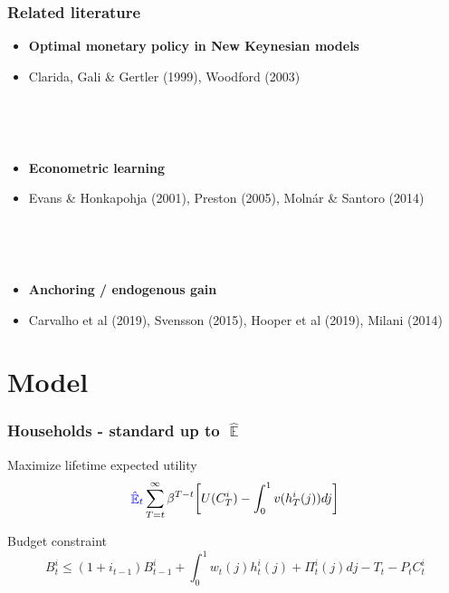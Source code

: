 \documentclass{beamer}
\DeclareMathOperator{\E}{\mathbb{E}}
\begin{document}
\begin{frame}
	\frametitle{Related literature}

\begin{itemize}
\item \textbf{Optimal monetary policy in New Keynesian models}
\item[] Clarida, Gali \& Gertler (1999), Woodford (2003)

\

\

\item \textbf{Econometric learning}
\item[] Evans \& Honkapohja (2001), Preston (2005), Moln\'ar \& Santoro (2014)

\

\

\item \textbf{Anchoring / endogenous gain} 
\item[] Carvalho et al (2019), Svensson (2015), Hooper et al (2019), Milani (2014)
\end{itemize}



\end{frame}

\section{Model}

\begin{frame}
	\frametitle{Households - standard up to $\hat{\E}$}
	\label{HH}

Maximize lifetime expected utility
\begin{equation}
\textcolor{blue}{\hat{\E}_t}\sum^{\infty}_{T=t}\beta^{T-t} \bigg[ U(C^i_T) - \int_0^1 v(h^i_T(j)) dj \bigg]
\label{lifetime_U}
\end{equation}	

Budget constraint
\begin{equation}
 B^i_t \leq (1+i_{t-1})B^i_{t-1} + \int_0^1 w_t(j)h^i_t(j) + \Pi_t^i(j)  dj-T_t -P_tC^i_t
 \label{BC}
\end{equation}



\vfill

\hyperlink{details_HHs_firms}{}
\end{frame}
\end{document}
